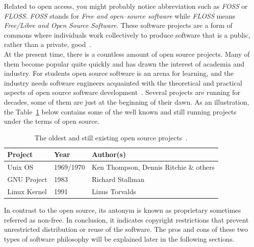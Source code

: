 \documentclass[11pt,a4paper]{article}
\theoremstyle{definition}
\begin{document}
    Related to open access, you might probably notice abbreviation such as \textit{FOSS} or \textit{FLOSS}. \textit{FOSS} stands for \textit{Free and open--source software} while \textit{FLOSS} means \textit{Free/Libre and Open Source Software}. These software projects are a form of commons where individuals work collectively to produce software that is a public, rather than a private, good~\cite{4273082}.\\

    At the present time, there is a countless amount of open source projects. Many of them become popular quite quickly and has drawn the interest of academia and industry. For students open source software is an arena for learning, and the industry needs software engineers acquainted with the theoretical and practical aspects of open source software development~\cite{4273076}. Several projects are running for decades, some of them are just at the beginning of their dawn. As an illustration, the Table~\ref{tab:open-source-projects} below contains some of the well known and still running projects under the terms of open source.\\

    \begin{table}[H]
        \begin{center}
            \begin{tabular}{l|l|l}
                Project      & Year      & Author(s)                              \\
                \hline
                Unix OS      & 1969/1970 & Ken Thompson, Dennis Ritchie \& others \\
                GNU Project  & 1983      & Richard Stallman                       \\
                Linux Kernel & 1991      & Linus Torvalds                         \\[-5mm]
            \end{tabular}
        \end{center}
        \caption{The oldest and still existing open source projects~\cite{SD:linux-kernel, WP:gnu-proj-init, DLACM:history-of-unix}.}
        \label{tab:open-source-projects}
    \end{table}

    In contrast to the open source, its antonym is known as proprietary sometimes referred as non-free. In conclusion, it indicates copyright restrictions that prevent unrestricted distribution or reuse of the software. The pros and cons of these two types of software philosophy will be explained later in the following sections.
\end{document}
